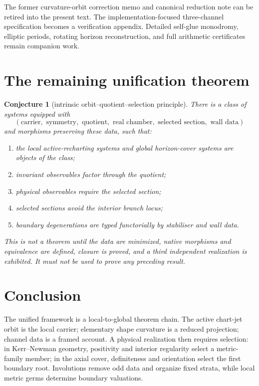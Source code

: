 \documentclass[11pt]{article}
\newtheorem{conjecture}[theorem]{Conjecture}
\theoremstyle{remark}
\newcommand{\proofstop}[1]{\par\medskip\noindent{\color{red!75!black}\textbf{STOP--PROOF.}} \textit{#1}\par\medskip}
\begin{document}
The former curvature-orbit correction memo and canonical reduction note can
be retired into the present text. The implementation-focused three-channel
specification becomes a verification appendix. Detailed self-glue
monodromy, elliptic periods, rotating horizon reconstruction, and full
arithmetic certificates remain companion work.

\section{The remaining unification theorem}

\begin{conjecture}[intrinsic orbit--quotient--selection principle]
There is a class of systems equipped with
\[
(\text{carrier},\text{ symmetry},\text{ quotient},
\text{ real chamber},\text{ selected section},\text{ wall data})
\]
and morphisms preserving these data, such that:
\begin{enumerate}[label=(\roman*)]
\item the local active-recharting systems and global horizon-cover systems are
objects of the class;
\item invariant observables factor through the quotient;
\item physical observables require the selected section;
\item selected sections avoid the interior branch locus;
\item boundary degenerations are typed functorially by stabiliser and wall
data.
\end{enumerate}
\end{conjecture}

\proofstop{This is not a theorem until the data are minimized, native
morphisms and equivalence are defined, closure is proved, and a third
independent realization is exhibited. It must not be used to prove any
preceding result.}

\section{Conclusion}

The unified framework is a local-to-global theorem chain. The active
chart-jet orbit is the local carrier; elementary shape curvature is a reduced
projection; channel data is a framed account. A physical realization then
requires selection: in Kerr--Newman geometry, positivity and interior
regularity select a metric-family member; in the axial cover, definiteness
and orientation select the first boundary root. Involutions remove odd data
and organize fixed strata, while local metric germs determine boundary
valuations.
\end{document}
